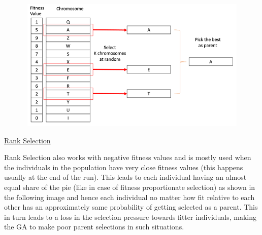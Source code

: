 \documentclass[12pt]{article}
\renewcommand{\_}{\kern-1.5pt\textunderscore\kern-1.5pt}
\begin{document}
\begin{enumerate}
\begin{adjustwidth}{0.03in}{0.03in}
\end{adjustwidth}




\begin{figure}[H]
	\begin{Center}
		\includegraphics[width=6.24in,height=2.51in]{./media/image10.png}
	\end{Center}
\end{figure}



\setlength{\parskip}{8.04pt}
\par

{\fontsize{14pt}{16.8pt}\selectfont \uline{Rank Selection}\par}\par

\setlength{\parskip}{7.2pt}
\begin{adjustwidth}{0.03in}{0.03in}
{\fontsize{11pt}{13.2pt}\selectfont Rank Selection also works with negative fitness values and is mostly used when the individuals in the population have very close fitness values (this happens usually at the end of the run). This leads to each individual having an almost equal share of the pie (like in case of fitness proportionate selection) as shown in the following image and hence each individual no matter how fit relative to each other has an approximately same probability of getting selected as a parent. This in turn leads to a loss in the selection pressure towards fitter individuals, making the GA to make poor parent selections in such situations.\par}\par

\end{adjustwidth}




\end{enumerate}
\end{document}
